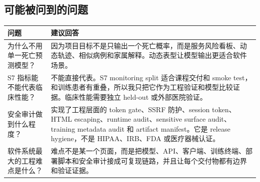 \documentclass[11pt,a4paper]{article}
\begin{document}
\subsection*{可能被问到的问题}
\begin{longtable}{@{}p{}p{}@{}}
\toprule
\textbf{问题} & \textbf{建议回答}\\
\midrule
为什么不用单一死亡预测模型？ &
因为项目目标不是只输出一个死亡概率，而是服务风险看板、动态轨迹、相似病例和家属解释。动态表型让模型输出更适合软件场景。\\
\addlinespace
S7 指标能不能代表临床性能？ &
不能直接代表。S7 monitoring split 适合课程交付和 smoke test，和训练患者有重叠，所以我只把它作为工程验证和模型比较证据。临床性能需要独立 held-out 或外部医院验证。\\
\addlinespace
安全审计做到什么程度？ &
实现了工程层面的 token gate、SSRF 防护、session token、HTML escaping、runtime audit、sensitive surface audit、training metadata audit 和 artifact manifest。它是 release hygiene，不是 HIPAA、IRB、FDA 或医疗器械认证。\\
\addlinespace
软件系统最大的工程难点是什么？ &
难点不是某一个页面，而是把模型、API、客户端、训练终端、部署脚本和安全审计接成可复现链路，并且让每个交付物都有边界和验证证据。\\
\bottomrule
\end{longtable}
\end{document}
